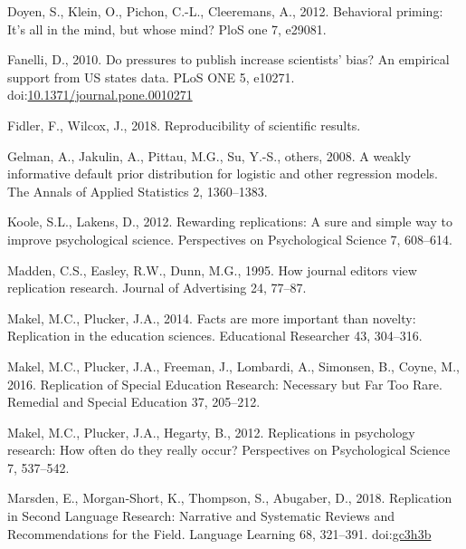 \documentclass[]{elsarticle} %
\newlength{\cslhangindent}
\newenvironment{CSLReferences}[2] %
 {%
  \setlength{\parindent}{0pt}
  \ifodd #1 \everypar{\setlength{\hangindent}{\cslhangindent}}\ignorespaces\fi
  \ifnum #2 > 0
  \setlength{\parskip}{#2\baselineskip}
  \fi
 }%
 {}
\begin{document}
\begin{CSLReferences}{1}{0}
\leavevmode{}%
Doyen, S., Klein, O., Pichon, C.-L., Cleeremans, A., 2012. Behavioral
priming: It's all in the mind, but whose mind? PloS one 7, e29081.

\leavevmode{}%
Fanelli, D., 2010. Do pressures to publish increase scientists' bias? An
empirical support from US states data. PLoS ONE 5, e10271.
doi:\href{https://doi.org/10.1371/journal.pone.0010271}{10.1371/journal.pone.0010271}

\leavevmode{}%
Fidler, F., Wilcox, J., 2018. Reproducibility of scientific results.

\leavevmode{}%
Gelman, A., Jakulin, A., Pittau, M.G., Su, Y.-S., others, 2008. A weakly
informative default prior distribution for logistic and other regression
models. The Annals of Applied Statistics 2, 1360--1383.

\leavevmode{}%
Koole, S.L., Lakens, D., 2012. Rewarding replications: {A} sure and
simple way to improve psychological science. Perspectives on
Psychological Science 7, 608--614.

\leavevmode{}%
Madden, C.S., Easley, R.W., Dunn, M.G., 1995. How journal editors view
replication research. Journal of Advertising 24, 77--87.

\leavevmode{}%
Makel, M.C., Plucker, J.A., 2014. Facts are more important than novelty:
{Replication} in the education sciences. Educational Researcher 43,
304--316.

\leavevmode{}%
Makel, M.C., Plucker, J.A., Freeman, J., Lombardi, A., Simonsen, B.,
Coyne, M., 2016. Replication of {Special} {Education} {Research}:
{Necessary} but {Far} {Too} {Rare}. Remedial and Special Education 37,
205--212.

\leavevmode{}%
Makel, M.C., Plucker, J.A., Hegarty, B., 2012. Replications in
psychology research: {How} often do they really occur? Perspectives on
Psychological Science 7, 537--542.

\leavevmode{}%
Marsden, E., Morgan‐Short, K., Thompson, S., Abugaber, D., 2018.
Replication in {Second} {Language} {Research}: {Narrative} and
{Systematic} {Reviews} and {Recommendations} for the {Field}. Language
Learning 68, 321--391. doi:\href{https://doi.org/gc3h3b}{gc3h3b}


\end{CSLReferences}
\end{document}

